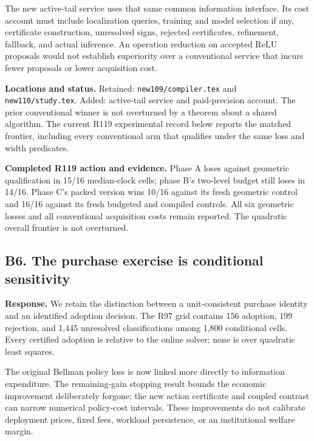 The new active-tail service uses that same common information interface. Its cost account must include localization queries, training and model selection if any, certificate construction, unresolved signs, rejected certificates, refinement, fallback, and actual inference. An operation reduction on accepted ReLU proposals would not establish superiority over a conventional service that incurs fewer proposals or lower acquisition cost.

\textbf{Locations and status.} Retained: \nolinkurl{new109/compiler.tex} and \nolinkurl{new110/study.tex}. Added: active-tail service and paid-precision account. The prior conventional winner is not overturned by a theorem about a shared algorithm. The current R119 experimental record below reports the matched frontier, including every conventional arm that qualifies under the same loss and width predicates.

\textbf{Completed R119 action and evidence.} Phase A loses against geometric qualification in 15/16 median-clock cells; phase B's two-level budget still loses in 14/16. Phase C's packed version wins 10/16 against its fresh geometric control and 16/16 against its fresh budgeted and compiled controls. All six geometric losses and all conventional acquisition costs remain reported. The quadratic overall frontier is not overturned.

\hypertarget{b6.-the-purchase-exercise-is-conditional-sensitivity}{%
\subsection{B6. The purchase exercise is conditional sensitivity}\label{b6.-the-purchase-exercise-is-conditional-sensitivity}}

\textbf{Response.} We retain the distinction between a unit-consistent purchase identity and an identified adoption decision. The R97 grid contains 156 adoption, 199 rejection, and 1,445 unresolved classifications among 1,800 conditional cells. Every certified adoption is relative to the online solver; none is over quadratic least squares.

The original Bellman policy loss is now linked more directly to information expenditure. The remaining-gain stopping result bounds the economic improvement deliberately forgone; the new action certificate and coupled contrast can narrow numerical policy-cost intervals. These improvements do not calibrate deployment prices, fixed fees, workload persistence, or an institutional welfare margin.

